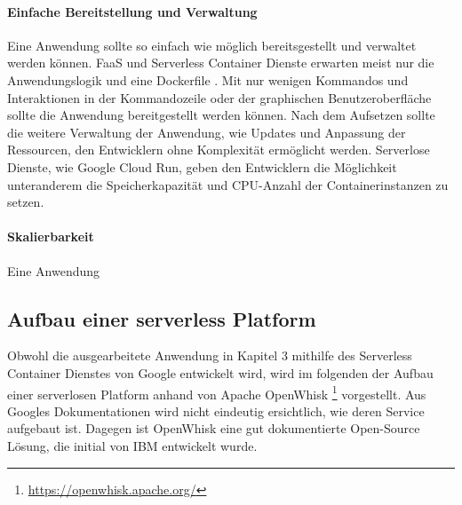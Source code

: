\paragraph{Einfache Bereitstellung und Verwaltung} Eine Anwendung sollte so einfach
wie möglich bereitsgestellt und verwaltet werden können.
FaaS und Serverless Container Dienste erwarten meist nur die
Anwendungslogik und eine Dockerfile \cite{ServerlessTrends}.
Mit nur wenigen Kommandos und Interaktionen in der Kommandozeile oder
der graphischen Benutzeroberfläche sollte die Anwendung
bereitgestellt werden können. Nach dem Aufsetzen sollte
die weitere Verwaltung der Anwendung, wie Updates und
Anpassung der Ressourcen, den Entwicklern ohne
Komplexität ermöglicht werden. Serverlose Dienste, wie
Google Cloud Run, geben den Entwicklern die Möglichkeit unteranderem
die Speicherkapazität \cite{CloudRunMemLimits} und
CPU-Anzahl \cite{CloudRunCpuAlloc} der Containerinstanzen zu setzen.  

\paragraph{Skalierbarkeit} Eine Anwendung  


% 


\subsection{Aufbau einer serverless Platform}
Obwohl die ausgearbeitete Anwendung in Kapitel 3
mithilfe des Serverless Container Dienstes von Google entwickelt wird,
wird im folgenden der Aufbau einer serverlosen Platform
anhand von Apache OpenWhisk
\footnote{\url{https://openwhisk.apache.org/}} vorgestellt.
Aus Googles Dokumentationen wird nicht eindeutig ersichtlich, wie
deren Service aufgebaut ist. Dagegen ist OpenWhisk eine
gut dokumentierte Open-Source Lösung, die initial von IBM entwickelt
wurde.

